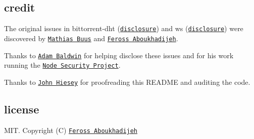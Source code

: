 \subsection*{credit}

The original issues in {\ttfamily bittorrent-\/dht} (\href{https://nodesecurity.io/advisories/68}{\tt disclosure}) and {\ttfamily ws} (\href{https://nodesecurity.io/advisories/67}{\tt disclosure}) were discovered by \href{https://github.com/mafintosh}{\tt Mathias Buus} and \href{http://feross.org/}{\tt Feross Aboukhadijeh}.

Thanks to \href{https://github.com/evilpacket}{\tt Adam Baldwin} for helping disclose these issues and for his work running the \href{https://nodesecurity.io/}{\tt Node Security Project}.

Thanks to \href{https://github.com/jhiesey}{\tt John Hiesey} for proofreading this R\+E\+A\+D\+ME and auditing the code.

\subsection*{license}

M\+IT. Copyright (C) \href{http://feross.org}{\tt Feross Aboukhadijeh} 
